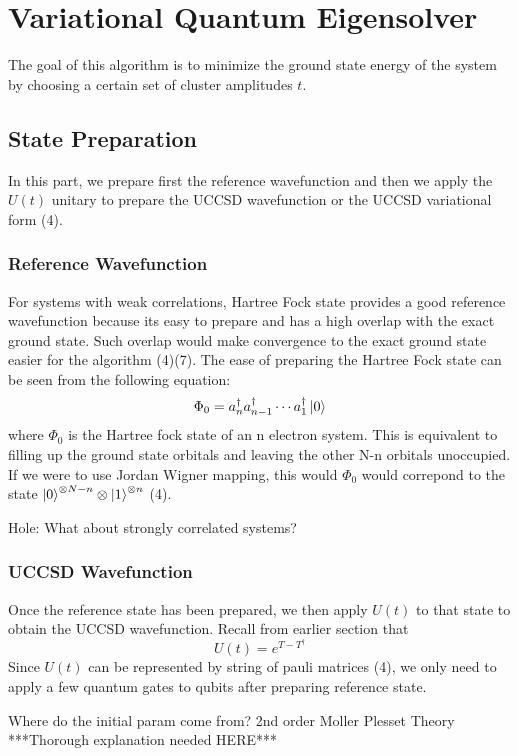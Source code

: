 \documentclass{article}
\begin{document}
\section{Variational Quantum Eigensolver}
  The goal of this algorithm is to minimize the ground state energy of the
  system by choosing a certain set of cluster amplitudes \(t\).
  \subsection{State Preparation}
    In this part, we prepare first the reference wavefunction and then we
    apply the \(U(t)\) unitary to prepare the UCCSD wavefunction or the
    UCCSD variational form (4).
    \subsubsection{Reference Wavefunction}
      For systems with weak correlations, Hartree Fock state provides a good
      reference wavefunction because its easy to prepare and has a high
      overlap with the exact ground state. Such overlap would make convergence
      to the exact ground state easier for the algorithm (4)(7). The ease
      of preparing the Hartree Fock state can be seen from the following
      equation:
      \[\Phi_0 = a^{\dagger}_{n}a^{\dagger}_{n-1}\cdots a^{\dagger}_1\ket{0}\]
      where \(\Phi_0\) is the Hartree fock state of an n electron system. This
      is equivalent to filling up the ground state orbitals and leaving the
      other N-n orbitals unoccupied. If we were to use Jordan Wigner mapping,
      this would \(\Phi_0\) would correpond to the state
      \(\ket{0}^{\otimes N-n}\otimes\ket{1}^{\otimes n}\) (4).

      Hole: What about strongly correlated systems?
    \subsubsection{UCCSD Wavefunction}
      Once the reference state has been prepared, we then apply \(U(t)\) to that
      state to obtain the UCCSD wavefunction. Recall from earlier section that
      \[U(t) = e^{T - T^{\dagger}}\]
      Since \(U(t)\) can be represented by string of pauli matrices (4), we
      only need to apply a few quantum gates to qubits after preparing
      reference state.

      Where do the initial param come from? 2nd order Moller Plesset
      Theory
      ***Thorough explanation needed HERE***
\end{document}
